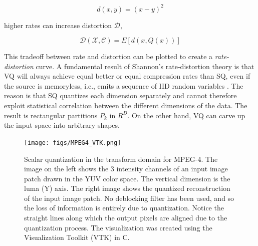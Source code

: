 \begin{equation}
d(x,y)=(x-y)^2 
\end{equation}

higher rates can increase distortion $\mathcal{D}$,

\begin{equation}
\mathcal{D(\mathcal{X}, \mathcal{C})} =E\left[d(x, Q(x)) \right]
\end{equation}

This tradeoff between rate and distortion can be plotted to create a \emph{rate-distortion} curve.  A fundamental result of Shannon's rate-distortion theory is that VQ will always achieve equal better or equal compression rates than SQ, even if the source is memoryless, i.e., emits a sequence of IID random variables \cite{1984_JNL_VQ_Gray}.   The reason is that SQ quantizes each dimension separately and cannot therefore exploit statistical correlation between the different dimensions of the data.  The result is rectangular partitions $P_k$ in $R^D$.  On the other hand, VQ can carve up the input space into arbitrary shapes.

\begin{figure}[t]		
	\center	
	\texttt{[image: figs/MPEG4\_VTK.png]}
	\caption{Scalar quantization in the transform domain for MPEG-4.  The image on the left shows the 3 intensity channels of an input image patch drawn in the YUV color space.  The vertical dimension is the luma (Y) axis.  The right image shows the quantized reconstruction of the input image patch.  No deblocking filter has been used, and so the loss of information is entirely due to quantization.  Notice the straight lines along which the output pixels are aligned due to the quantization process.  The visualization was created using the Visualization Toolkit (VTK) \cite{VTK} in C.}
	\label{fig:MPEG4_VTK}
\end{figure}


